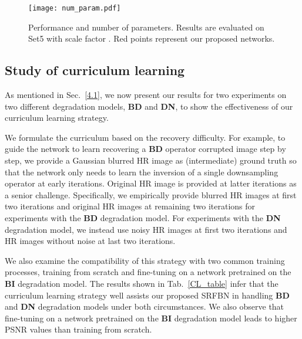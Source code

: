 \documentclass[10pt,twocolumn,letterpaper]{article}
\begin{document}
	\begin{figure}[!htbp]
		\centering
		\texttt{[image: num\_param.pdf]}
		\caption{Performance and number of parameters. Results are evaluated on Set5 with scale factor . Red points represent our proposed networks.}\label{num_param}\vspace{-0.45cm}
	\end{figure}
	\subsection{Study of curriculum learning}
	\label{4.4}
	As mentioned in Sec.~\ref{4.1}, we now present our results for two experiments on two different degradation models, \ie \textbf{BD} and \textbf{DN}, to show the effectiveness of our curriculum learning strategy.
	
	We formulate the curriculum based on the recovery difficulty. For example, to guide the network to learn recovering a \textbf{BD} operator corrupted image step by step, we provide a Gaussian blurred HR image as (intermediate) ground truth so that the network only needs to learn the inversion of a single downsampling operator at early iterations. Original HR image is provided at latter iterations as a senior challenge. Specifically, we empirically provide blurred HR images at first two iterations and original HR images at remaining two iterations for experiments with the \textbf{BD} degradation model. For experiments with the \textbf{DN} degradation model, we instead use noisy HR images at first two iterations and HR images without noise at last two iterations. 

	We also examine the compatibility of this strategy with two common training processes, \ie training from scratch and fine-tuning on a network pretrained on the \textbf{BI} degradation model. The results shown in Tab.~\ref{CL_table} infer that the curriculum learning strategy well assists our proposed SRFBN in handling \textbf{BD} and \textbf{DN} degradation models under both circumstances. We also observe that fine-tuning on a network pretrained on the \textbf{BI} degradation model leads to higher PSNR values than training from scratch. 
\end{document}
